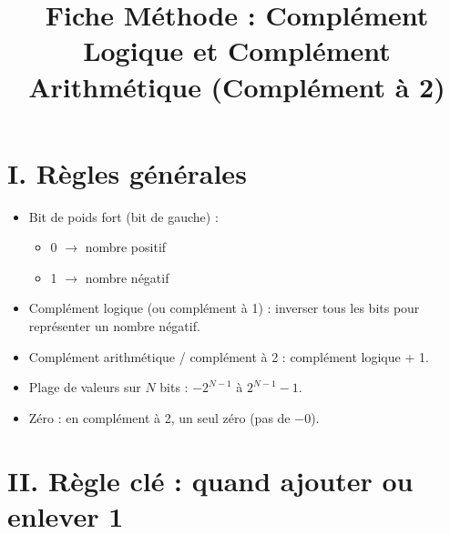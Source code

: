 \documentclass[a4paper,12pt]{article}
\title{Fiche Méthode : Complément Logique et Complément Arithmétique (Complément à 2)}
\author{}
\date{}
\begin{document}
 

  

\maketitle 

  

\section*{I. Règles générales} 

\begin{itemize} 

    \item Bit de poids fort (bit de gauche) :  

    \begin{itemize} 

        \item 0 $\rightarrow$ nombre positif 

        \item 1 $\rightarrow$ nombre négatif 

    \end{itemize} 

    \item Complément logique (ou complément à 1) : inverser tous les bits pour représenter un nombre négatif. 

    \item Complément arithmétique / complément à 2 : complément logique + 1. 

    \item Plage de valeurs sur $N$ bits : $-2^{N-1}$ à $2^{N-1}-1$. 

    \item Zéro : en complément à 2, un seul zéro (pas de $-0$). 

\end{itemize} 

  

\section*{II. Règle clé : quand ajouter ou enlever 1} 

  
\end{document}

